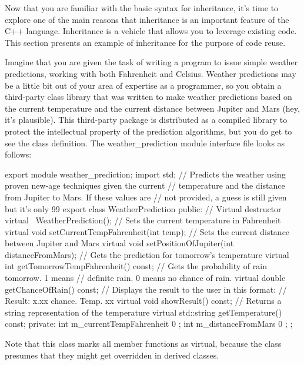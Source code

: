 
Now that you are familiar with the basic syntax for inheritance, it’s time to explore one of the main reasons that inheritance is an important feature of the C++ language. Inheritance is a vehicle that allows you to leverage existing code. This section presents an example of inheritance for the purpose of code reuse.


Imagine that you are given the task of writing a program to issue simple weather predictions, working with both Fahrenheit and Celsius. Weather predictions may be a little bit out of your area of expertise as a programmer, so you obtain a third-party class library that was written to make weather predictions based on the current temperature and the current distance between Jupiter and Mars (hey, it’s plausible). This third-party package is distributed as a compiled library to protect the intellectual property of the prediction algorithms, but you do get to see the class definition. The weather\_prediction module interface file looks as follows:

\begin{cpp}
export module weather_prediction;
import std;
// Predicts the weather using proven new-age techniques given the current
// temperature and the distance from Jupiter to Mars. If these values are
// not provided, a guess is still given but it's only 99%
export class WeatherPrediction
{
    public:
        // Virtual destructor
        virtual ~WeatherPrediction();
        // Sets the current temperature in Fahrenheit
        virtual void setCurrentTempFahrenheit(int temp);
        // Sets the current distance between Jupiter and Mars
        virtual void setPositionOfJupiter(int distanceFromMars);
        // Gets the prediction for tomorrow's temperature
        virtual int getTomorrowTempFahrenheit() const;
        // Gets the probability of rain tomorrow. 1 means
        // definite rain. 0 means no chance of rain.
        virtual double getChanceOfRain() const;
        // Displays the result to the user in this format:
        // Result: x.xx chance. Temp. xx
        virtual void showResult() const;
        // Returns a string representation of the temperature
        virtual std::string getTemperature() const;
    private:
        int m_currentTempFahrenheit { 0 };
        int m_distanceFromMars { 0 };
};
\end{cpp}

Note that this class marks all member functions as virtual, because the class presumes that they might get overridden in derived classes.

